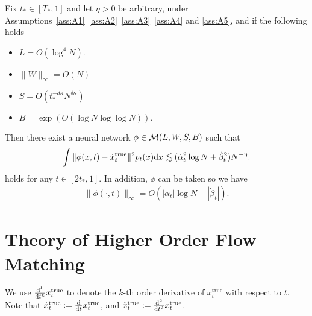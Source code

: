 \begin{lemma}\label{lem:error_approx_large_t}
    Fix $t_{*} \in [T_{*},1]$ and let $\eta>0$ be arbitrary, under Assumptions~\ref{ass:A1}~\ref{ass:A2}~\ref{ass:A3}~\ref{ass:A4} and \ref{ass:A5}, and if the following holds 
    \begin{itemize}
        \item $L = O(\log^4 N )$.
        \item $\|W\|_{\infty} = O(N)$
        \item $S = O(t_{*}^{- d\kappa} N^{\delta\kappa})$
        \item $B = \exp(O (\log N \log \log N ) ).$
    \end{itemize}
  Then there exist a neural network $\phi  \in  {\cal M}(L,W,S,B)$ such that
\begin{align*}
  \int  \| \phi(x,t) - \dot{x}^\mathrm{true}_t \|^2 p_{t} (x) \mathrm{d} x \lesssim (\dot{\alpha}_t^{2} \log N  +   \dot{\beta}_t^{2} ) N^{-\eta}.
 \end{align*}
 holds for any $t \in [2t_{*}, 1]$. In addition, $\phi$ can be taken so we have
 \begin{align*}
       \|\phi(\cdot,t) \|_{\infty} =  O( |\dot{\alpha}_t | \log N +  |\dot{\beta}_t | ).
 \end{align*}
\end{lemma}

\section{Theory of Higher Order Flow Matching}\label{sec:app:higher_order_flow_matching}

We use $\frac{\mathrm{d}^k}{\mathrm{d} t^k} x_t^\mathrm{true}$ to denote the $k$-th order derivative of $x_t^\mathrm{true}$ with respect to $t$. Note that $\dot{x}^\mathrm{true}_t := \frac{\mathrm{d}}{\mathrm{d} t} x^\mathrm{true}_t$, and $\ddot{x}^\mathrm{true}_t := \frac{\mathrm{d}^2}{\mathrm{d} t^2} x^\mathrm{true}_t$.

